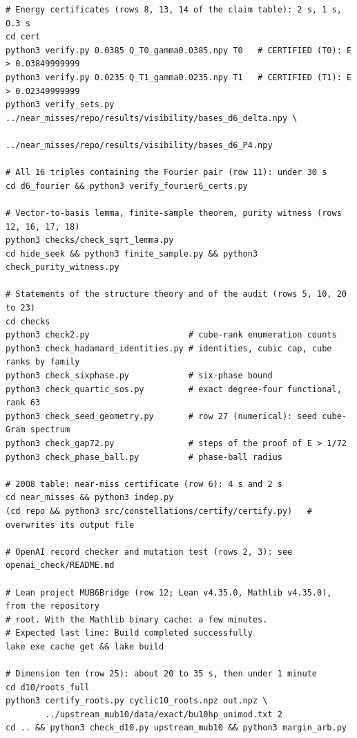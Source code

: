 \documentclass[11pt]{article}
\theoremstyle{definition}
\theoremstyle{remark}
\begin{document}
{\small
\begin{verbatim}
# Energy certificates (rows 8, 13, 14 of the claim table): 2 s, 1 s, 0.3 s
cd cert
python3 verify.py 0.0385 Q_T0_gamma0.0385.npy T0   # CERTIFIED (T0): E > 0.03849999999
python3 verify.py 0.0235 Q_T1_gamma0.0235.npy T1   # CERTIFIED (T1): E > 0.02349999999
python3 verify_sets.py ../near_misses/repo/results/visibility/bases_d6_delta.npy \
                       ../near_misses/repo/results/visibility/bases_d6_P4.npy

# All 16 triples containing the Fourier pair (row 11): under 30 s
cd d6_fourier && python3 verify_fourier6_certs.py

# Vector-to-basis lemma, finite-sample theorem, purity witness (rows 12, 16, 17, 18)
python3 checks/check_sqrt_lemma.py
cd hide_seek && python3 finite_sample.py && python3 check_purity_witness.py

# Statements of the structure theory and of the audit (rows 5, 10, 20 to 23)
cd checks
python3 check2.py                    # cube-rank enumeration counts
python3 check_hadamard_identities.py # identities, cubic cap, cube ranks by family
python3 check_sixphase.py            # six-phase bound
python3 check_quartic_sos.py         # exact degree-four functional, rank 63
python3 check_seed_geometry.py       # row 27 (numerical): seed cube-Gram spectrum
python3 check_gap72.py               # steps of the proof of E > 1/72
python3 check_phase_ball.py          # phase-ball radius

# 2008 table: near-miss certificate (row 6): 4 s and 2 s
cd near_misses && python3 indep.py
(cd repo && python3 src/constellations/certify/certify.py)   # overwrites its output file

# OpenAI record checker and mutation test (rows 2, 3): see openai_check/README.md

# Lean project MUB6Bridge (row 12; Lean v4.35.0, Mathlib v4.35.0), from the repository
# root. With the Mathlib binary cache: a few minutes.
# Expected last line: Build completed successfully
lake exe cache get && lake build

# Dimension ten (row 25): about 20 to 35 s, then under 1 minute
cd d10/roots_full
python3 certify_roots.py cyclic10_roots.npz out.npz \
        ../upstream_mub10/data/exact/bu10hp_unimod.txt 2
cd .. && python3 check_d10.py upstream_mub10 && python3 margin_arb.py
\end{verbatim}
}
\end{document}
